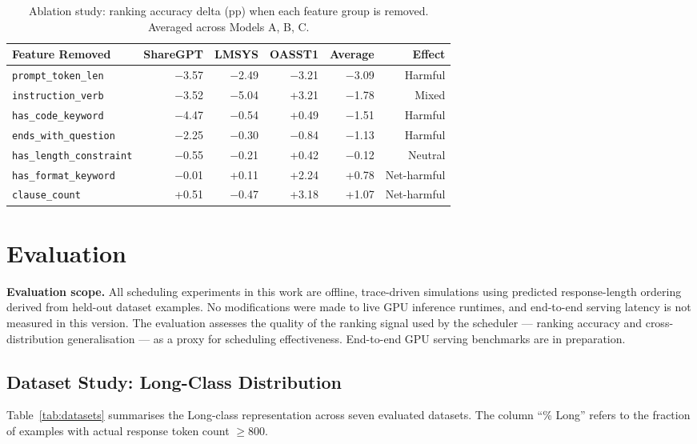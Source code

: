 \documentclass[10pt,letterpaper]{article}
\begin{document}
\begin{table}[t]
\centering
\caption{Ablation study: ranking accuracy delta (pp) when each feature group is removed. Averaged across Models A, B, C.}
\label{tab:ablation}
\small
\begin{tabular}{lrrrrr}
\toprule
Feature Removed & ShareGPT & LMSYS & OASST1 & Average & Effect \\
\midrule
\texttt{prompt\_token\_len}      & $-$3.57 & $-$2.49 & $-$3.21 & $-$3.09 & Harmful \\
\texttt{instruction\_verb}       & $-$3.52 & $-$5.04 & +3.21   & $-$1.78 & Mixed \\
\texttt{has\_code\_keyword}      & $-$4.47 & $-$0.54 & +0.49   & $-$1.51 & Harmful \\
\texttt{ends\_with\_question}    & $-$2.25 & $-$0.30 & $-$0.84 & $-$1.13 & Harmful \\
\texttt{has\_length\_constraint} & $-$0.55 & $-$0.21 & +0.42   & $-$0.12 & Neutral \\
\texttt{has\_format\_keyword}    & $-$0.01 & +0.11   & +2.24   & +0.78   & Net-harmful \\
\texttt{clause\_count}           & +0.51   & $-$0.47 & +3.18   & +1.07   & Net-harmful \\
\bottomrule
\end{tabular}
\end{table}

\section{Evaluation}
\label{sec:evaluation}

\noindent\textbf{Evaluation scope.} All scheduling experiments in this work are offline, trace-driven simulations using predicted response-length ordering derived from held-out dataset examples. No modifications were made to live GPU inference runtimes, and end-to-end serving latency is not measured in this version. The evaluation assesses the quality of the ranking signal used by the scheduler --- ranking accuracy and cross-distribution generalisation --- as a proxy for scheduling effectiveness. End-to-end GPU serving benchmarks are in preparation.

\subsection{Dataset Study: Long-Class Distribution}

Table~\ref{tab:datasets} summarises the Long-class representation across seven evaluated datasets. The column ``\% Long'' refers to the fraction of examples with actual response token count $\geq 800$.
\end{document}
